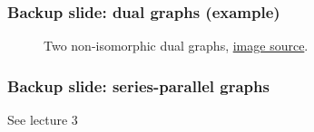 \documentclass[xetex,mathserif,serif]{beamer}
\begin{document}
\begin{frame}
  \frametitle{Backup slide: dual graphs (example)}

  \begin{figure}
    \begin{center}
      
    \end{center}
    \caption{Two non-isomorphic dual graphs, \href{https://en.wikipedia.org/wiki/Dual_graph\#/media/File:Noniso_dual_graphs.svg}{image source}.}
  \end{figure}
  \end{frame}

\begin{frame}
  \frametitle{Backup slide: series-parallel graphs}
  See lecture 3
\end{frame}


\end{document}
